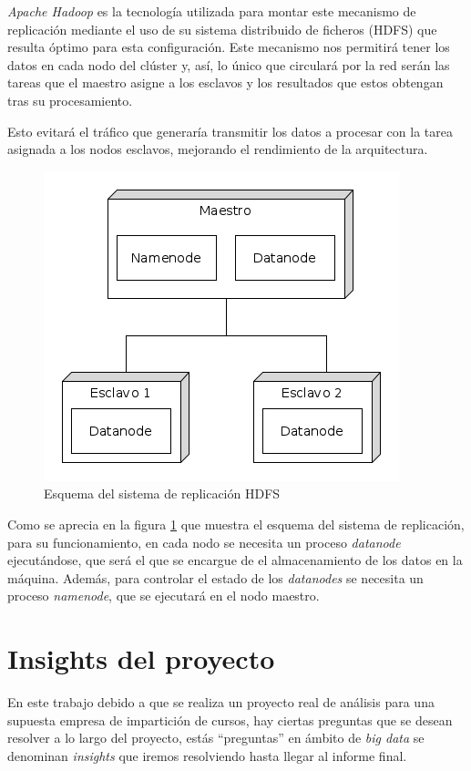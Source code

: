 \textit{Apache Hadoop} es la tecnología utilizada para montar este mecanismo de replicación mediante el uso de su sistema distribuido de ficheros (\gls{HDFS}) que resulta óptimo para esta configuración. Este mecanismo nos permitirá tener los datos en cada nodo del clúster y, así, lo único que circulará por la red serán las tareas que el maestro asigne a los esclavos y los resultados que estos obtengan tras su procesamiento. 

Esto evitará el tráfico que generaría transmitir los datos a procesar con la tarea asignada a los nodos esclavos, mejorando el rendimiento de la arquitectura.

\begin{figure}[htp!]
	\centering
	\caption{Esquema del sistema de replicación \gls{HDFS}}
	\label{fig:hdfs}
	\includegraphics[scale=0.6]{graphics/hadoop}
\end{figure}

Como se aprecia en la figura \ref{fig:hdfs} que muestra el esquema del sistema de replicación, para su funcionamiento, en cada nodo se necesita un proceso \textit{datanode} ejecutándose, que será el que se encargue de el almacenamiento de los datos en la máquina. Además, para controlar el estado de los \textit{datanodes} se necesita un proceso \textit{namenode}, que se ejecutará en el nodo maestro.

\clearpage
\section{Insights del proyecto \label{insights}}
En este trabajo debido a que se realiza un proyecto real de análisis para una supuesta empresa de impartición de cursos, hay ciertas preguntas que se desean resolver a lo largo del proyecto, estás ``preguntas'' en ámbito de \textit{big data} se denominan \textit{insights} que iremos resolviendo hasta llegar al informe final.

